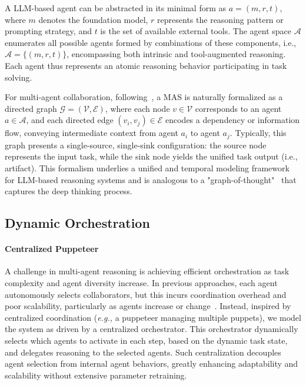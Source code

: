 \documentclass{article}
\newcommand{\eg}{\textit{e.g., }}
\begin{document}
A LLM-based agent can be abstracted in its minimal form as $ a = (m, r, t) $, where $m$ denotes the foundation model, $r$ represents the reasoning pattern or prompting strategy, and $t$ is the set of available external tools. The agent space $\mathcal{A}$ enumerates all possible agents formed by combinations of these components, i.e., $\mathcal{A} = \{ (m, r, t) \} $, encompassing both intrinsic and tool-augmented reasoning. Each agent thus represents an atomic reasoning behavior participating in task solving.

For multi-agent collaboration, following~\citep{qian2025scaling}, a MAS is naturally formalized as a directed graph $ \mathcal{G} = (\mathcal{V}, \mathcal{E}) $, where each node $ v \in \mathcal{V} $ corresponds to an agent $ a \in \mathcal{A} $, and each directed edge $ (v_i, v_j) \in \mathcal{E} $ encodes a dependency or information flow, conveying intermediate context from agent $a_i$ to agent $a_j$. Typically, this graph presents a single-source, single-sink configuration: the source node represents the input task, while the sink node yields the unified task output (i.e., artifact). This formalism underlies a unified and temporal modeling framework for LLM-based reasoning systems and is analogous to a "graph-of-thought"~\cite{10.1609/aaai.v38i16.29720} that captures the deep thinking process.

\subsection{Dynamic Orchestration}
\paragraph{Centralized Puppeteer}
A challenge in multi-agent reasoning is achieving efficient orchestration as task complexity and agent diversity increase. In previous approaches, each agent autonomously selects collaborators, but this incurs coordination overhead and poor scalability, particularly as agents increase or change~\cite{zhuge2024languageagentsoptimizablegraphs,qian2025scaling}. Instead, inspired by centralized coordination (\eg a puppeteer managing multiple puppets), we model the system as driven by a centralized orchestrator. This orchestrator dynamically selects which agents to activate in each step, based on the dynamic task state, and delegates reasoning to the selected agents. Such centralization decouples agent selection from internal agent behaviors, greatly enhancing adaptability and scalability without extensive parameter retraining.
\end{document}
